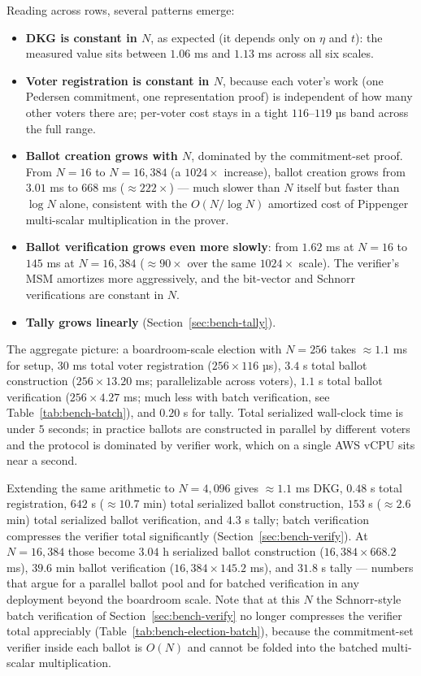 \documentclass[12pt,a4paper,oneside]{report}
\begin{document}
Reading across rows, several patterns emerge:

\begin{itemize}
\item \textbf{DKG is constant in $N$}, as expected (it depends only on
$\eta$ and $t$): the measured value sits between $1.06$ ms and $1.13$ ms
across all six scales.
\item \textbf{Voter registration is constant in $N$}, because each voter's
work (one Pedersen commitment, one representation proof) is independent
of how many other voters there are; per-voter cost stays in a tight
$116$--$119$ µs band across the full range.
\item \textbf{Ballot creation grows with $N$}, dominated by the
commitment-set proof. From $N = 16$ to $N = 16{,}384$ (a $1024\times$
increase), ballot creation grows from $3.01$ ms to $668$ ms
($\approx 222\times$) --- much slower than $N$ itself but faster than
$\log N$ alone, consistent with the $O(N / \log N)$ amortized cost of
Pippenger multi-scalar multiplication in the prover.
\item \textbf{Ballot verification grows even more slowly}: from
$1.62$ ms at $N = 16$ to $145$ ms at $N = 16{,}384$ ($\approx 90\times$
over the same $1024\times$ scale). The verifier's MSM amortizes more
aggressively, and the bit-vector and Schnorr verifications are
constant in $N$.
\item \textbf{Tally grows linearly} (Section~\ref{sec:bench-tally}).
\end{itemize}

The aggregate picture: a boardroom-scale election with $N = 256$ takes
$\approx 1.1$ ms for setup, $30$ ms total voter registration
($256 \times 116$ µs), $3.4$ s total ballot construction
($256 \times 13.20$ ms; parallelizable across voters), $1.1$ s total
ballot verification ($256 \times 4.27$ ms; much less with batch
verification, see Table~\ref{tab:bench-batch}), and $0.20$ s for
tally. Total serialized wall-clock time is under $5$ seconds; in
practice ballots are constructed in parallel by different voters and
the protocol is dominated by verifier work, which on a single AWS vCPU
sits near a second.

Extending the same arithmetic to $N = 4{,}096$ gives $\approx 1.1$ ms
DKG, $0.48$ s total registration, $642$ s ($\approx 10.7$ min) total
serialized ballot construction, $153$ s ($\approx 2.6$ min) total
serialized ballot verification, and $4.3$ s tally; batch verification
compresses the verifier total significantly
(Section~\ref{sec:bench-verify}). At $N = 16{,}384$ those become
$3.04$ h serialized ballot construction ($16{,}384 \times 668.2$ ms),
$39.6$ min ballot verification ($16{,}384 \times 145.2$ ms), and
$31.8$ s tally --- numbers that argue for a parallel ballot pool and
for batched verification in any deployment beyond the boardroom
scale. Note that at this $N$ the Schnorr-style batch verification of
Section~\ref{sec:bench-verify} no longer compresses the verifier
total appreciably (Table~\ref{tab:bench-election-batch}), because the
commitment-set verifier inside each ballot is $O(N)$ and cannot be
folded into the batched multi-scalar multiplication.
\end{document}
